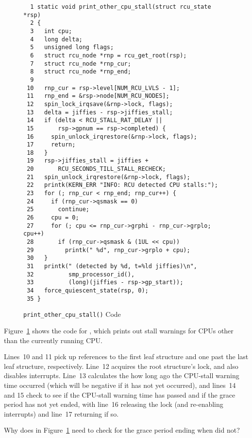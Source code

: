 \begin{figure}[tbp]
{ \scriptsize
\begin{verbatim}
  1 static void print_other_cpu_stall(struct rcu_state *rsp)
  2 {
  3   int cpu;
  4   long delta;
  5   unsigned long flags;
  6   struct rcu_node *rnp = rcu_get_root(rsp);
  7   struct rcu_node *rnp_cur;
  8   struct rcu_node *rnp_end;
  9
 10   rnp_cur = rsp->level[NUM_RCU_LVLS - 1];
 11   rnp_end = &rsp->node[NUM_RCU_NODES];
 12   spin_lock_irqsave(&rnp->lock, flags);
 13   delta = jiffies - rsp->jiffies_stall;
 14   if (delta < RCU_STALL_RAT_DELAY ||
 15       rsp->gpnum == rsp->completed) {
 16     spin_unlock_irqrestore(&rnp->lock, flags);
 17     return;
 18   }
 19   rsp->jiffies_stall = jiffies +
 20       RCU_SECONDS_TILL_STALL_RECHECK;
 21   spin_unlock_irqrestore(&rnp->lock, flags);
 22   printk(KERN_ERR "INFO: RCU detected CPU stalls:");
 23   for (; rnp_cur < rnp_end; rnp_cur++) {
 24     if (rnp_cur->qsmask == 0)
 25       continue;
 26     cpu = 0;
 27     for (; cpu <= rnp_cur->grphi - rnp_cur->grplo; cpu++)
 28       if (rnp_cur->qsmask & (1UL << cpu))
 29         printk(" %d", rnp_cur->grplo + cpu);
 30   }
 31   printk(" (detected by %d, t=%ld jiffies)\n",
 32          smp_processor_id(),
 33          (long)(jiffies - rsp->gp_start));
 34   force_quiescent_state(rsp, 0);
 35 }
\end{verbatim}
}
\caption{{\tt print\_other\_cpu\_stall()} Code}
\label{fig:app:rcuimpl:rcutreewt:Code for print-other-cpu-stall}
\end{figure}

Figure~\ref{fig:app:rcuimpl:rcutreewt:Code for print-other-cpu-stall}
shows the code for , which prints out
stall warnings for CPUs other than the currently running CPU.

Lines~10 and 11 pick up references to the first leaf 
structure and one past the last leaf  structure,
respectively.
Line~12 acquires the root  structure's lock, and also
disables interrupts.
Line~13 calculates the how long ago the CPU-stall warning time occurred
(which will be negative if it has not yet occurred), and lines~14 and 15
check to see if the CPU-stall warning time has passed and if the
grace period has not yet ended,
with line~16 releasing the lock (and re-enabling interrupts) and
line~17 returning if so.

\QuickQuiz{}
	Why does  in
	Figure~\ref{fig:app:rcuimpl:rcutreewt:Code for print-other-cpu-stall}
	need to check for the grace period ending when
	 did not?
 \QuickQuizEnd

